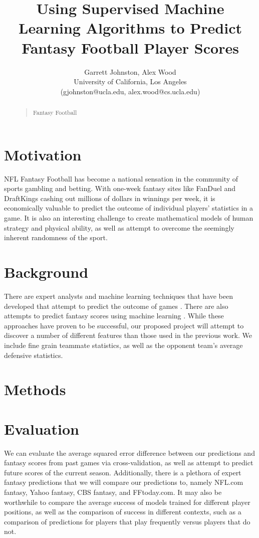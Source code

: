 \documentclass[11pt,a4paper]{article}
\title{Using Supervised Machine Learning Algorithms to Predict Fantasy Football Player Scores}
\author{Garrett Johnston, Alex Wood \\
University of California, Los Angeles \\
(gjohnston@ucla.edu, alex.wood@cs.ucla.edu) \\
}
\begin{document}
\maketitle

\begin{abstract}
\begin{quote}
  Fantasy Football
\end{quote}
\end{abstract}

\section{Motivation}
NFL Fantasy Football has become a national sensation in the community of sports gambling and betting.  With one-week fantasy sites like FanDuel and DraftKings cashing out millions of dollars in winnings per week, it is economically valuable to predict the outcome of individual players’ statistics in a game. It is also an interesting challenge to create mathematical models of human strategy and physical ability, as well as attempt to overcome the seemingly inherent randomness of the sport.

\section{Background}
There are expert analysts and machine learning techniques that have been developed that attempt to predict the outcome of games \cite{Cornell}. There are also attempts to predict fantasy scores using machine learning \cite{UMASS}. While these approaches have proven to be successful, our proposed project will attempt to discover a number of different features than those used in the previous work. We include fine grain teammate statistics, as well as the opponent team’s average defensive statistics.

\section{Methods}

\section{Evaluation}
We can evaluate the average squared error difference between our predictions and fantasy scores from past games via cross-validation, as well as attempt to predict future scores of the current season. Additionally, there is a plethora of expert fantasy predictions that we will compare our predictions to, namely NFL.com fantasy, Yahoo fantasy, CBS fantasy, and FFtoday.com. It may also be worthwhile to compare the average success of models trained for different player positions, as well as the comparison of success in different contexts, such as a comparison of predictions for players that play frequently versus players that do not.
\end{document}
